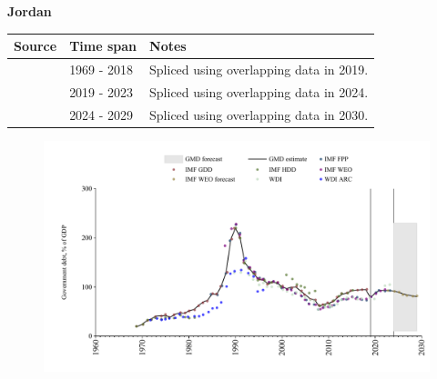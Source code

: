 \documentclass[12pt,a4paper,landscape]{article}
\begin{document}
\begin{adjustbox}{max totalsize={\paperwidth}{\paperheight},center}
\begin{minipage}[t][\textheight][t]{\textwidth}
\vspace*{0.5cm}
{}
\begin{center}
{\Large\bfseries Jordan}
\end{center}
\vspace{0.5cm}
\begin{table}[H]
\centering
\small
\begin{tabular}{|l|l|l|}
\hline
\textbf{Source} & \textbf{Time span} & \textbf{Notes} \\
\hline
\rowcolor{white}\cite{IMF_GDD}& 1969 - 2018 &Spliced using overlapping data in 2019.\\
\rowcolor{lightgray}\cite{IMF_FPP}& 2019 - 2023 &Spliced using overlapping data in 2024.\\
\rowcolor{white}\cite{IMF_WEO_forecast}& 2024 - 2029 &Spliced using overlapping data in 2030.\\
\hline
\end{tabular}
\end{table}
\begin{figure}[H]
\centering
\includegraphics[width=\textwidth,height=0.6\textheight,keepaspectratio]{graphs/JOR_govdebt_GDP.pdf}
\end{figure}
\end{minipage}
\end{adjustbox}
\end{document}
